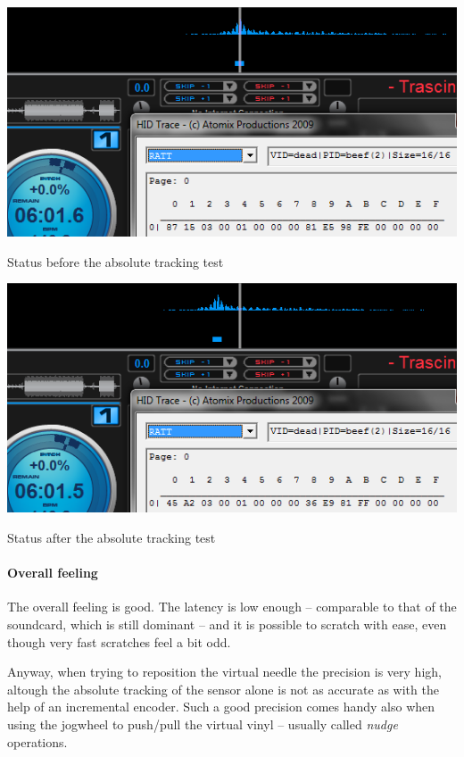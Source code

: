 \documentclass[a4paper,10pt]{article}
\makeatletter
\newenvironment{figurehere}{\def\@captype{figure}\vspace{2ex}}{\vspace{2ex}}
\makeatother
\begin{document}
\begin{multicols}{2}
\begin{figurehere}
	\centering
	\includegraphics[keepaspectratio=true,width=\columnwidth]{images/scratch_test_start.png}
	\caption{Status before the absolute tracking test}
	\label{fig:scratch_test_start}
\end{figurehere}

\begin{figurehere}
	\centering
	\includegraphics[keepaspectratio=true,width=\columnwidth]{images/scratch_test_end.png}
	\caption{Status after the absolute tracking test}
	\label{fig:scratch_test_end}
\end{figurehere}


\paragraph{Overall feeling}
The overall feeling is good. The latency is low enough -- comparable to that
of the soundcard, which is still dominant -- and it is possible to scratch
with ease, even though very fast scratches feel a bit odd.

Anyway, when trying to reposition the virtual needle the precision is very
high, altough the absolute tracking of the sensor alone is not as accurate as
with the help of an incremental encoder. Such a good precision comes handy
also when using the jogwheel to push/pull the virtual vinyl -- usually called
\emph{nudge} operations.


\end{multicols}
\end{document}
